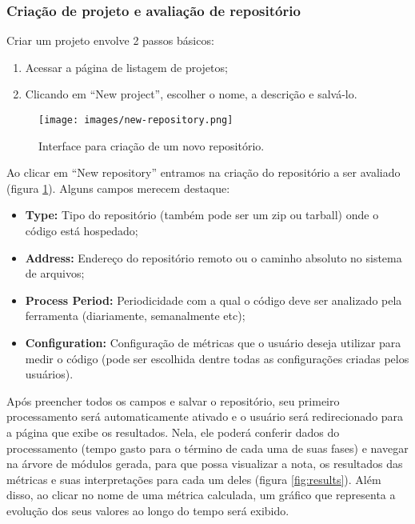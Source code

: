 \documentclass[12pt]{article}
\begin{document}
    \subsubsection{Criação de projeto e avaliação de repositório}
    Criar um projeto envolve 2 passos básicos:
    \begin{enumerate}
      \item Acessar a página de listagem de projetos;
      \item Clicando em ``New project'', escolher o nome, a descrição e salvá-lo.
    \end{enumerate}

    \begin{figure}[H]
      \centering
      \texttt{[image: images/new-repository.png]}
      \caption{Interface para criação de um novo repositório.}
      \label{fig:new-repository}
    \end{figure}

    Ao clicar em ``New repository'' entramos na criação do repositório a ser avaliado (figura \ref{fig:new-repository}). Alguns campos merecem destaque:
    \begin{itemize}
      \item\textbf{Type:} Tipo do repositório (também pode ser um zip ou tarball) onde o código está hospedado;
      \item\textbf{Address:} Endereço do repositório remoto ou o caminho absoluto no sistema de arquivos;
      \item\textbf{Process Period:} Periodicidade com a qual o código deve ser analizado pela ferramenta (diariamente, semanalmente etc);
      \item\textbf{Configuration:} Configuração de métricas que o usuário deseja utilizar para medir o código (pode ser escolhida dentre todas as configurações criadas pelos usuários).
    \end{itemize}
    Após preencher todos os campos e salvar o repositório, seu primeiro processamento será automaticamente ativado e o usuário será redirecionado para a página que exibe os resultados. Nela, ele poderá conferir dados do processamento (tempo gasto para o término de cada uma de suas fases) e navegar na árvore de módulos gerada, para que possa visualizar a nota, os resultados das métricas e suas interpretações para cada um deles (figura \ref{fig:results}). Além disso, ao clicar no nome de uma métrica calculada, um gráfico que representa a evolução dos seus valores ao longo do tempo será exibido.
\end{document}
